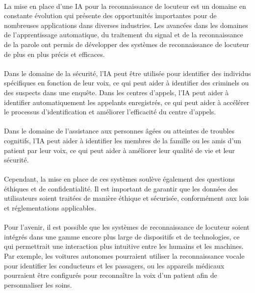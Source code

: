 \conclusion
\paragraph{}La mise en place d'une IA pour la reconnaissance de locuteur est un domaine en constante évolution qui présente des opportunités importantes pour de nombreuses applications dans diverses industries. Les avancées dans les domaines de l'apprentissage automatique, du traitement du signal et de la reconnaissance de la parole ont permis de développer des systèmes de reconnaissance de locuteur de plus en plus précis et efficaces.	
\paragraph{}Dans le domaine de la sécurité, l'IA peut être utilisée pour identifier des individus spécifiques en fonction de leur voix, ce qui peut aider à identifier des criminels ou des suspects dans une enquête. Dans les centres d'appels, l'IA peut aider à identifier automatiquement les appelants enregistrés, ce qui peut aider à accélérer le processus d'identification et améliorer l'efficacité du centre d'appels.
\paragraph{}Dans le domaine de l'assistance aux personnes âgées ou atteintes de troubles cognitifs, l'IA peut aider à identifier les membres de la famille ou les amis d'un patient par leur voix, ce qui peut aider à améliorer leur qualité de vie et leur sécurité.
\paragraph{}Cependant, la mise en place de ces systèmes soulève également des questions éthiques et de confidentialité. Il est important de garantir que les données des utilisateurs soient traitées de manière éthique et sécurisée, conformément aux lois et réglementations applicables.
\paragraph{}Pour l'avenir, il est possible que les systèmes de reconnaissance de locuteur soient intégrés dans une gamme encore plus large de dispositifs et de technologies, ce qui permettrait une interaction plus intuitive entre les humains et les machines. Par exemple, les voitures autonomes pourraient utiliser la reconnaissance vocale pour identifier les conducteurs et les passagers, ou les appareils médicaux pourraient être configurés pour reconnaître la voix d'un patient afin de personnaliser les soins.
